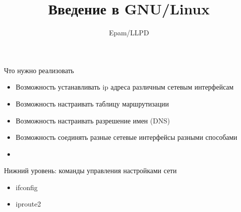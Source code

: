 \documentclass[ignorenonframetext, professionalfonts, hyperref={pdftex, unicode}]{beamer}
\title{Введение в GNU/Linux}
\author{Epam/LLPD}
\begin{document}
\frame{
	\tableofcontents
}

\begin{frame}{Что нужно реализовать}
  \begin{itemize}
    \item Возможность устанавливать ip адреса различным сетевым интерфейсам
    \item Возможность настраивать таблицу маршрутизации
    \item Возможность настраивать разрешение имен (DNS)
    \item Возможность соединять разные сетевые интерфейсы разными способами
  \end{itemize}
\begin{itemize}
\item
\end{itemize}
\end{frame}

\begin{frame}{Нижний уровень: команды управления настройками сети}
\begin{itemize}
  \item ifconfig
  \item iproute2
\end{itemize}
\end{frame}
\end{document}
